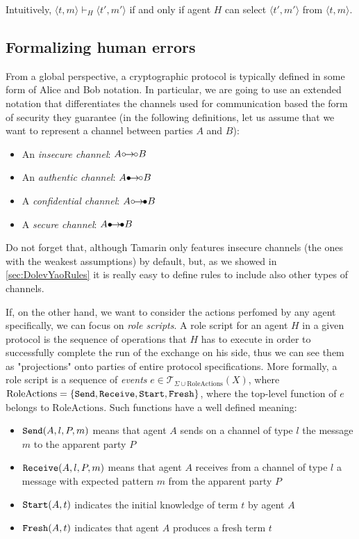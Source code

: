 \documentclass{article}
\def\ins{\hbox{$\circ$}\kern-1.5pt\hbox{$\to$}\kern -1pt\hbox{$\circ$}}
\def\sec{\hbox{$\bullet$}\kern-1.5pt\hbox{$\to$}\kern -1pt\hbox{$\bullet$}}
\def\auth{\hbox{$\bullet$}\kern-1.5pt\hbox{$\to$}\kern -1pt\hbox{$\circ$}}
\def\conf{\hbox{$\circ$}\kern-1.5pt\hbox{$\to$}\kern -1pt\hbox{$\bullet$}}
\newcommand{\mono}[1]{\textrm{\tt #1}}
\newcounter{definition}[section]\setcounter{definition}{0}
\begin{document}
Intuitively, $\langle t, m \rangle \vdash_H \langle t', m' \rangle$ if and only if agent $H$ can select $\langle t', m' \rangle$ from $\langle t, m \rangle$.

\subsection{Formalizing human errors}\label{sec:formalizing_human_errors}

From a global perspective, a cryptographic protocol is typically defined in some form of Alice and Bob notation. In particular, we are going to use an extended notation that differentiates the channels used for communication based the form of security they guarantee (in the following definitions, let us assume that we want to represent a channel between parties $A$ and $B$):

\begin{itemize}
    \item An \textit{insecure channel}: $A \ins B$
    \item An \textit{authentic channel}: $A \auth B$
    \item A \textit{confidential channel}: $A \conf B$
    \item A \textit{secure channel}: $A \sec B$
\end{itemize}

Do not forget that, although Tamarin only features insecure channels (the ones with the weakest assumptions) by default, but, as we showed in \ref{sec:DolevYaoRules} it is really easy to define rules to include also other types of channels.

If, on the other hand, we want to consider the actions perfomed by any agent specifically, we can focus on \textit{role scripts}. A role script for an agent $H$ in a given protocol is the sequence of operations that $H$ has to execute in order to successfully complete the run of the exchange on his side, thus we can see them as "projections" onto parties of entire protocol specifications. More formally, a role script is a sequence of \textit{events} $e \in \mathcal{T}_{\Sigma \cup \textrm{RoleActions}}(X)$, where $\textrm{RoleActions} = \{\mono{Send}, \mono{Receive}, \mono{Start}, \mono{Fresh} \}$, where the top-level function of $e$ belongs to $\textrm{RoleActions}$. Such functions have a well defined meaning:

\begin{itemize}
    \item $\mono{Send}(A,l,P,m)$ means that agent $A$ sends on a channel of type $l$ the message $m$ to the apparent party $P$
    \item $\mono{Receive}(A,l,P,m)$ means that agent $A$ receives from a channel of type $l$ a message with expected pattern $m$ from the apparent party $P$
    \item $\mono{Start}(A,t)$ indicates the initial knowledge of term $t$ by agent $A$
    \item $\mono{Fresh}(A,t)$ indicates that agent $A$ produces a fresh term $t$
\end{itemize}
\end{document}
